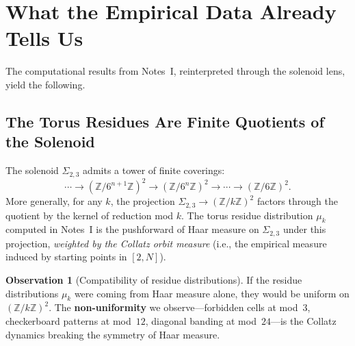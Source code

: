 \documentclass[11pt,a4paper]{article}
\newcommand{\Z}{\mathbb{Z}}
\newcommand{\A}{\mathbb{A}}
\newcommand{\Sol}{\mathrm{Sol}}
\theoremstyle{plain}
\theoremstyle{definition}
\newtheorem{observation}[theorem]{Observation}
\begin{document}
\begin{center}
\small
{}
\end{center}


\section{What the Empirical Data Already Tells Us}\label{sec:empirical}

The computational results from Notes~I, reinterpreted through the solenoid lens, yield the following.

\subsection{The Torus Residues Are Finite Quotients of the Solenoid}

The solenoid $\Sigma_{2,3}$ admits a tower of finite coverings:
\begin{equation}\label{eq:tower}
    \cdots \to (\Z / 6^{n+1}\Z)^2 \to (\Z / 6^n \Z)^2 \to \cdots \to (\Z/6\Z)^2.
\end{equation}
More generally, for any $k$, the projection $\Sigma_{2,3} \to (\Z/k\Z)^2$ factors through the quotient by the kernel of reduction mod $k$. The torus residue distribution $\mu_k$ computed in Notes~I is the pushforward of Haar measure on $\Sigma_{2,3}$ under this projection, \emph{weighted by the Collatz orbit measure} (i.e., the empirical measure induced by starting points in $[2, N]$).

\begin{observation}[Compatibility of residue distributions]
    If the residue distributions $\mu_k$ were coming from Haar measure alone, they would be uniform on $(\Z/k\Z)^2$. The \textbf{non-uniformity} we observe---forbidden cells at mod~$3$, checkerboard patterns at mod~$12$, diagonal banding at mod~$24$---is the Collatz dynamics breaking the symmetry of Haar measure.
\end{observation}
\end{document}
